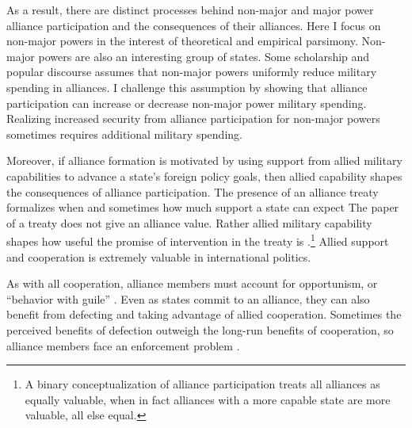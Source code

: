 \documentclass[12pt]{article}
\begin{document}
As a result, there are distinct processes behind non-major and major power alliance participation and the consequences of their alliances. 
Here I focus on non-major powers in the interest of theoretical and empirical parsimony.
Non-major powers are also an interesting group of states. 
Some scholarship and popular discourse assumes that non-major powers uniformly reduce military spending in alliances.
I challenge this assumption by showing that alliance participation can increase or decrease non-major power military spending. 
Realizing increased security from alliance participation for non-major powers sometimes requires additional military spending. 


Moreover, if alliance formation is motivated by using support from allied military capabilities to advance a state's foreign policy goals, then allied capability shapes the consequences of alliance participation. 
The presence of an alliance treaty formalizes when and sometimes how much support a state can expect 
The paper of a treaty does not give an alliance value.
Rather allied military capability shapes how useful the promise of intervention in the treaty is \citep{Johnsonetal2015}.\footnote{A binary conceptualization of alliance participation treats all alliances as equally valuable, when in fact alliances with a more capable state are more valuable, all else equal.}
Allied support and cooperation is extremely valuable in international politics. 


As with all cooperation, alliance members must account for opportunism, or ``behavior with guile'' \citep{Williamson1985}. 
Even as states commit to an alliance, they can also benefit from defecting and taking advantage of allied cooperation. 
Sometimes the perceived benefits of defection outweigh the long-run benefits of cooperation, so alliance members face an enforcement problem \citep{Fearon1998a, Koremenosetal2001}.
\end{document}
